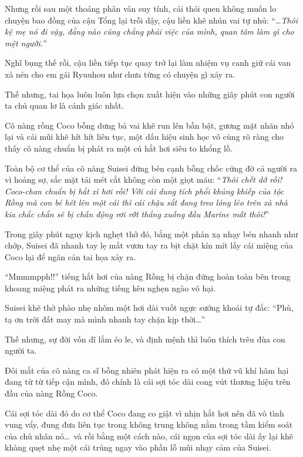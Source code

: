 \documentclass[../main.tex]{subfiles}
\begin{document}

Nhưng rồi sau một thoáng phân vân suy tính, cái thói quen không muốn lo chuyện bao đồng của cậu Tổng lại trỗi dậy, cậu liền khẽ nhún vai tự nhủ: ``\textit{\dots Thôi kệ mẹ nó đi vậy, đằng nào cũng chẳng phải việc của mình, quan tâm làm gì cho mệt người.}''

Nghĩ bụng thế rồi, cậu liền tiếp tục quay trở lại làm nhiệm vụ canh giữ cái van xả nén cho em gái Ryuuhou như chưa từng có chuyện gì xảy ra.

Thế nhưng, tai họa luôn luôn lựa chọn xuất hiện vào những giây phút con người ta chủ quan lơ là cảnh giác nhất.

Cô nàng rồng Coco bỗng dưng bả vai khẽ run lên bần bật, gương mặt nhăn nhó lại và cái mũi khẽ hít hít liên tục, một dấu hiệu sinh học vô cùng rõ ràng cho thấy cô nàng chuẩn bị phát ra một cú hắt hơi siêu to khổng lồ.

Toàn bộ cơ thể của cô nàng Suisei đứng bên cạnh bỗng chốc cứng đờ cả người ra vì hoảng sợ, sắc mặt tái mét cắt không còn một giọt máu: ``\textit{Thôi chết dở rồi!  Coco-chan chuẩn bị hắt xì hơi rồi! Với cái dung tích phổi khủng khiếp của tộc Rồng mà con bé hét lên một cái thì cái chậu sắt đang treo lỏng lẻo trên xà nhà kia chắc chắn sẽ bị chấn động rơi rớt thẳng xuống đầu Marine mất thôi!}''

Trong giây phút nguy kịch nghẹt thở đó, bằng một phản xạ nhạy bén nhanh như chớp, Suisei đã nhanh tay lẹ mắt vươn tay ra bịt chặt kín mít lấy cái miệng của Coco lại để ngăn cản tai họa xảy ra.

``Mmmmpph!!'' tiếng hắt hơi của nàng Rồng bị chặn đứng hoàn toàn bên trong khoang miệng phát ra những tiếng kêu nghẹn ngào vô hại.

Suisei khẽ thở phào nhẹ nhõm một hơi dài vuốt ngực sướng khoái tự đắc: ``Phù, tạ ơn trời đất may mà mình nhanh tay chặn kịp thời\dots''

Thế nhưng, sự đời vốn dĩ lắm éo le, và định mệnh thì luôn thích trêu đùa con người ta.

Đôi mắt của cô nàng ca sĩ bỗng nhiên phát hiện ra có một thứ vũ khí hãm hại đang từ từ tiếp cận mình, đó chính là cái sợi tóc dài cong vút thương hiệu trên đầu của nàng Rồng Coco.

Cái sợi tóc dài đó do cơ thể Coco đang co giật vì nhịn hắt hơi nên đã vô tình vung vẩy, đung đưa liên tục trong không trung không nằm trong tầm kiểm soát của chủ nhân nó\dots\ và rồi bằng một cách nào, cái ngọn của sợi tóc dài ấy lại khẽ khàng quẹt nhẹ một cái trúng ngay vào phần lỗ mũi nhạy cảm của Suisei.
\end{document}
